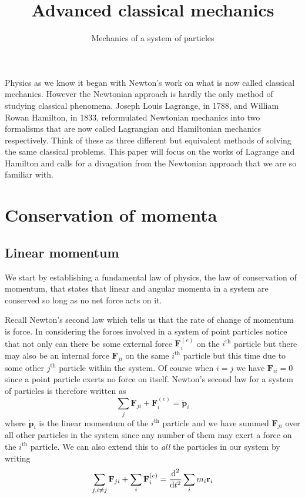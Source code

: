 \documentclass[english,seminar,headertitle]{lecture}
\title{Advanced classical mechanics}
\subtitle{Mechanics of a system of particles}
\author{}
\date{}{}{}
\begin{document}
\noindent Physics as we know it began with Newton's work on what is now called classical mechanics. However the Newtonian approach is hardly the only method of studying classical phenomena. Joseph Louis Lagrange, in 1788, and William Rowan Hamilton, in 1833, reformulated Newtonian mechanics into two formalisms that are now called Lagrangian and Hamiltonian mechanics respectively. Think of these as three different but equivalent methods of solving the same classical problems. This paper will focus on the works of Lagrange and Hamilton and calls for a divagation from the Newtonian approach that we are so familiar with.
%
\section{Conservation of momenta}

\subsection{Linear momentum}\label{sec:linear-momentum}
%
We start by establishing a fundamental law of physics, the law of conservation of momentum, that states that linear and angular momenta in a system are conserved so long as no net force acts on it.

Recall Newton's second law which tells us that the rate of change of momentum is force. In considering the forces involved in a system of point particles notice that not only can there be some external force $\mathbf{F}_i^{(e)}$ on the $i^\textrm{th}$ particle but there may also be an internal force $\mathbf{F}_{ji}$ on the same $i^\textrm{th}$ particle but this time due to some other $j^\textrm{th}$ particle within the system. Of course when $i = j$ we have $\mathbf{F}_{ii} = 0$ since a point particle exerts no force on itself. Newton's second law for a system of particles is therefore written as
\begin{equation}
\sum_j\mathbf{F}_{ji} + \mathbf{F}_i^{(e)}= \dot{\mathbf{p}}_i \label{eq:newton-second-single-particle}
\end{equation}%
where $\mathbf{\dot{p}}_i$ is the linear momentum of the $i^\textrm{th}$ particle and we have summed $\mathbf{F}_{ji}$ over all other particles in the system since any number of them may exert a force on the $i^\textrm{th}$ particle. We can also extend this to \textit{all} the particles in our system by writing
\begin{equation}
\sum_{j,i \neq j}\mathbf{F}_{ji} + \sum_i\mathbf{F}_i^{(e)} = {\textrm{d}^2 \over \textrm{d}t^2} \sum_i m_i\mathbf{r}_i \label{eq:newton-second-multi-particle}
\end{equation}%
\end{document}
